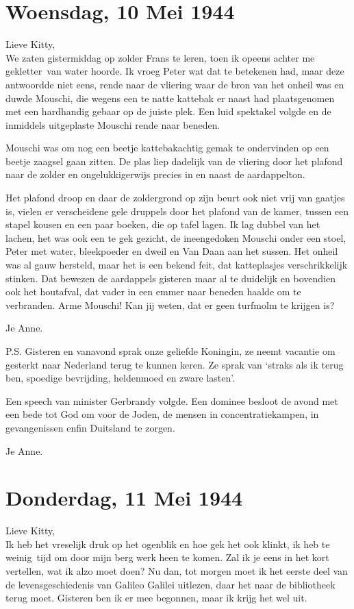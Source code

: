 \documentclass{book}
\begin{document}
\section*{Woensdag, 10 Mei 1944}

Lieve Kitty,\\
We zaten gistermiddag op zolder Frans te leren, toen ik opeens
achter me gekletter~van water hoorde. Ik vroeg Peter wat dat te betekenen had,
maar deze antwoordde niet eens, rende naar de vliering waar de bron van het
onheil was en duwde Mouschi, die wegens een te natte kattebak er naast had
plaatsgenomen met een hardhandig gebaar op de juiste plek. Een luid spektakel
volgde en de inmiddels uitgeplaste Mouschi rende naar beneden.

Mouschi was om nog een beetje kattebakachtig gemak te ondervinden op een beetje
zaagsel gaan zitten. De plas liep dadelijk van de vliering door het plafond naar
de zolder en ongelukkigerwijs precies in en naast de aardappelton.

Het plafond droop en daar de zoldergrond op zijn beurt ook niet vrij van gaatjes
is, vielen er verscheidene gele druppels door het plafond van de kamer, tussen
een stapel kousen en een paar boeken, die op tafel lagen.  Ik lag dubbel van het
lachen, het was ook een te gek gezicht, de ineengedoken Mouschi onder een stoel,
Peter met water, bleekpoeder en dweil en Van Daan aan het sussen. Het onheil was
al gauw hersteld, maar het is een bekend feit, dat katteplasjes verschrikkelijk
stinken. Dat bewezen de aardappels gisteren maar al te duidelijk en bovendien
ook het houtafval, dat vader in een emmer naar beneden haalde om te verbranden.
Arme Mouschi! Kan jij weten, dat er geen turfmolm te krijgen is?

Je Anne.

P.S. Gisteren en vanavond sprak onze geliefde Koningin, ze neemt vacantie om
gesterkt naar Nederland terug te kunnen keren. Ze sprak van `straks als ik terug
ben, spoedige bevrijding, heldenmoed en zware lasten'.

Een speech van minister Gerbrandy volgde. Een dominee besloot de avond met een
bede tot God om voor de Joden, de mensen in concentratiekampen, in gevangenissen
enfin Duitsland te zorgen.

Je Anne.

\section*{Donderdag, 11 Mei 1944}

Lieve Kitty,\\
Ik heb het vreselijk druk op het ogenblik en hoe gek het ook
klinkt, ik heb te weinig~tijd om door mijn berg werk heen te komen.  Zal ik je
eens in het kort vertellen, wat ik alzo moet doen? Nu dan, tot morgen moet ik
het eerste deel van de levensgeschiedenis van Galileo Galilei uitlezen, daar het
naar de bibliotheek terug moet. Gisteren ben ik er mee begonnen, maar ik krijg
het wel uit.
\end{document}
